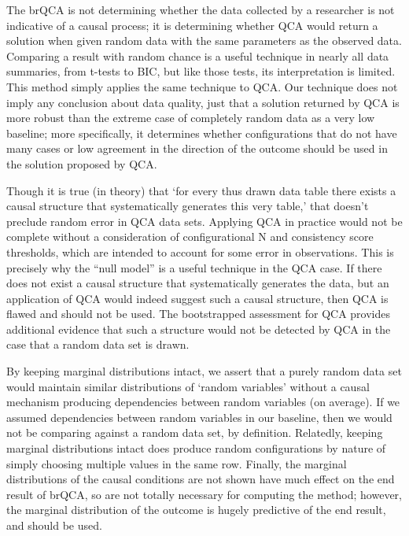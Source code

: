 \documentclass[10pt,stdletter,dateno,sigleft]{newlfm} %
\begin{document}
\begin{newlfm}
The brQCA is not determining whether the data collected by a researcher is not indicative of a causal process; it is determining whether QCA would return a solution when given random data with the same parameters as the observed data. Comparing a result with random chance is a useful technique in nearly all data summaries, from t-tests to BIC, but like those tests, its interpretation is limited. This method simply applies the same technique to QCA. Our technique does not imply any conclusion about data quality, just that a solution returned by QCA is more robust than the extreme case of completely random data as a very low baseline; more specifically, it determines whether configurations that do not have many cases or low agreement in the direction of the outcome should be used in the solution proposed by QCA. 

Though it is true (in theory) that `for every thus drawn data table there exists a causal structure that systematically generates this very table,' that doesn't preclude random error in QCA data sets. Applying QCA in practice would not be complete without a consideration of configurational N and consistency score thresholds, which are intended to account for some error in observations. This is precisely why the ``null model'' is a useful technique in the QCA case. If there does not exist a causal structure that systematically generates the data, but an application of QCA would indeed suggest such a causal structure, then QCA is flawed and should not be used. The bootstrapped assessment for QCA provides additional evidence that such a structure would not be detected by QCA in the case that a random data set is drawn.


By keeping marginal distributions intact, we assert that a purely random data set would maintain similar distributions of `random variables' without a causal mechanism producing dependencies between random variables (on average). If we assumed dependencies between random variables in our baseline, then we would not be comparing against a random data set, by definition. Relatedly, keeping marginal distributions intact does produce random configurations by nature of simply choosing multiple values in the same row. Finally, the marginal distributions of the causal conditions are not shown have much effect on the end result of brQCA, so are not totally necessary for computing the method; however, the marginal distribution of the outcome is hugely predictive of the end result, and should be used. 


\end{newlfm}
\end{document}
